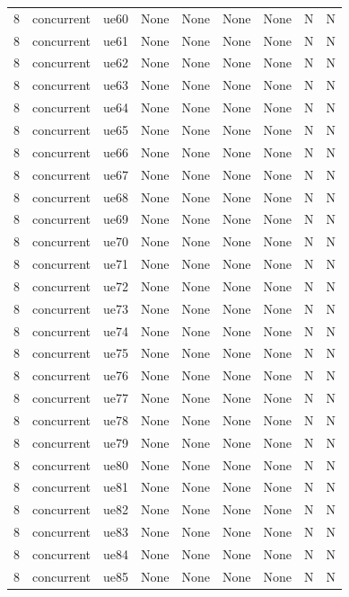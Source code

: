 \begin{table}[ht]
\begin{tabular}{|c|c|c|c|c|c|c|c|c|}
8 & concurrent & ue60 & None & None & None & None & N & N \\
8 & concurrent & ue61 & None & None & None & None & N & N \\
8 & concurrent & ue62 & None & None & None & None & N & N \\
8 & concurrent & ue63 & None & None & None & None & N & N \\
8 & concurrent & ue64 & None & None & None & None & N & N \\
8 & concurrent & ue65 & None & None & None & None & N & N \\
8 & concurrent & ue66 & None & None & None & None & N & N \\
8 & concurrent & ue67 & None & None & None & None & N & N \\
8 & concurrent & ue68 & None & None & None & None & N & N \\
8 & concurrent & ue69 & None & None & None & None & N & N \\
8 & concurrent & ue70 & None & None & None & None & N & N \\
8 & concurrent & ue71 & None & None & None & None & N & N \\
8 & concurrent & ue72 & None & None & None & None & N & N \\
8 & concurrent & ue73 & None & None & None & None & N & N \\
8 & concurrent & ue74 & None & None & None & None & N & N \\
8 & concurrent & ue75 & None & None & None & None & N & N \\
8 & concurrent & ue76 & None & None & None & None & N & N \\
8 & concurrent & ue77 & None & None & None & None & N & N \\
8 & concurrent & ue78 & None & None & None & None & N & N \\
8 & concurrent & ue79 & None & None & None & None & N & N \\
8 & concurrent & ue80 & None & None & None & None & N & N \\
8 & concurrent & ue81 & None & None & None & None & N & N \\
8 & concurrent & ue82 & None & None & None & None & N & N \\
8 & concurrent & ue83 & None & None & None & None & N & N \\
8 & concurrent & ue84 & None & None & None & None & N & N \\
8 & concurrent & ue85 & None & None & None & None & N & N \\

\end{tabular}
\end{table}
